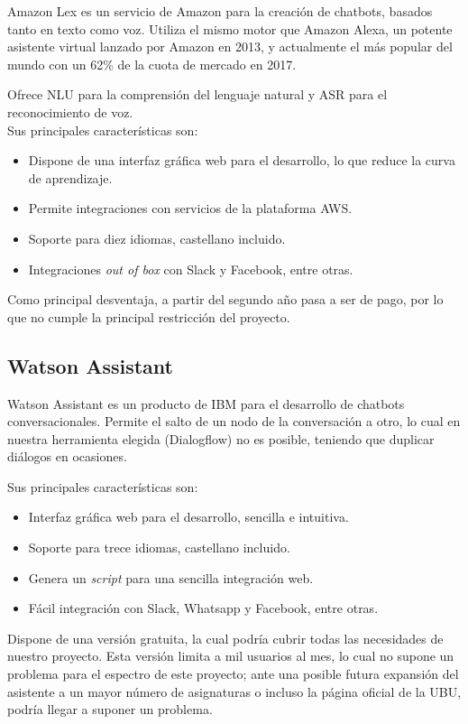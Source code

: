 Amazon Lex es un servicio de Amazon para la creación de chatbots, basados tanto en texto como voz.
Utiliza el mismo motor que Amazon Alexa, un potente asistente virtual lanzado por Amazon en 2013, y actualmente el más popular del mundo con un 62\% de la cuota de mercado en 2017.\cite{alexa}

Ofrece NLU para la comprensión del lenguaje natural y ASR para el reconocimiento de voz. \\

Sus principales características son:
\begin{itemize}
	\item Dispone de una interfaz gráfica web para el desarrollo, lo que reduce la curva de aprendizaje.
	\item Permite integraciones con servicios de la plataforma AWS.
	\item Soporte para diez idiomas, castellano incluido.
	\item Integraciones \textit{out of box} con Slack y Facebook, entre otras.
\end{itemize}  

Como principal desventaja, a partir del segundo año pasa a ser de pago, por lo que no cumple la principal restricción del proyecto. 
\newpage

\subsection{Watson Assistant \cite{WatsonAssistant}} 

Watson Assistant es un producto de IBM para el desarrollo de chatbots conversacionales.
Permite el salto de un nodo de la conversación a otro, lo cual en nuestra herramienta elegida (Dialogflow) no es posible, teniendo que duplicar diálogos en ocasiones.

Sus principales características son:
\begin{itemize}
	\item Interfaz gráfica web para el desarrollo, sencilla e intuitiva.
	\item Soporte para trece idiomas, castellano incluido.
	\item Genera un \textit{script} para una sencilla integración web.
	\item Fácil integración con Slack, Whatsapp y Facebook, entre otras.
\end{itemize}

Dispone de una versión gratuita, la cual podría cubrir todas las necesidades de nuestro proyecto. Esta versión limita a mil usuarios al mes, lo cual no supone un problema para el espectro de este proyecto; ante una posible futura expansión del asistente a un mayor número de asignaturas o incluso la página oficial de la UBU, podría llegar a suponer un problema. \\

